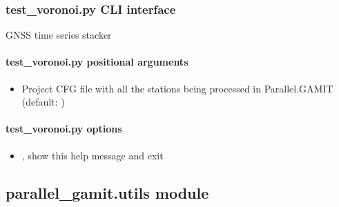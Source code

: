 \documentclass[letterpaper,10pt,english]{sphinxmanual}
\begin{document}
\subsubsection{test\_voronoi.py \sphinxhyphen{} CLI interface}
\label{\detokenize{parallel_gamit:test_voronoi.py---CLI-interface}}
\sphinxAtStartPar
GNSS time series stacker

\begin{sphinxVerbatim}[commandchars=\\\{\}]
 \PYG{p}{[}\PYG{p}{]}   
\end{sphinxVerbatim}


\paragraph{test\_voronoi.py positional arguments}
\label{\detokenize{parallel_gamit:test_voronoi.py-positional-arguments}}\begin{itemize}
\item {} 
\sphinxAtStartPar
{\hyperref[\detokenize{parallel_gamit:test_voronoi.py-_project-cfg-file_}]{}} \sphinxhyphen{} Project CFG file with all the stations being processed in Parallel.GAMIT (default: )

\end{itemize}


\paragraph{test\_voronoi.py options}
\label{\detokenize{parallel_gamit:test_voronoi.py-options}}\begin{itemize}
\item {} 
\sphinxAtStartPar
{\hyperref[\detokenize{parallel_gamit:test_voronoi.py--h}]{}}, {\hyperref[\detokenize{parallel_gamit:test_voronoi.py---help}]{}} \sphinxhyphen{} show this help message and exit

\end{itemize}


\subsection{parallel\_gamit.utils module}
\label{\detokenize{parallel_gamit:parallel-gamit-utils-module}}
\end{document}
